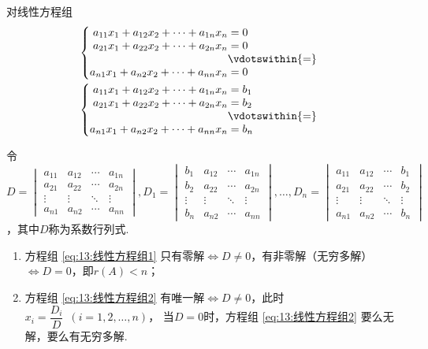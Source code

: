 \begin{theorem}  \label{thm:13:Cramer}
    对线性方程组
    \begin{gather}
        \label{eq:13:线性方程组1}
        \begin{cases} \begin{aligned}
            a_{11}x_1+a_{12}x_2+\cdots+a_{1n}x_n &= 0 \\
            a_{21}x_1+a_{22}x_2+\cdots+a_{2n}x_n &= 0 \\
            &\vdotswithin{ = } \\
            a_{n1}x_1+a_{n2}x_2+\cdots+a_{nn}x_n &= 0
        \end{aligned} \end{cases}
        \\
        \label{eq:13:线性方程组2}
        \begin{cases} \begin{aligned}
            a_{11}x_1+a_{12}x_2+\cdots+a_{1n}x_n &= b_1 \\
            a_{21}x_1+a_{22}x_2+\cdots+a_{2n}x_n &= b_2 \\
            &\vdotswithin{ = } \\
            a_{n1}x_1+a_{n2}x_2+\cdots+a_{nn}x_n &= b_n
        \end{aligned} \end{cases}
    \end{gather}

    令$D=\begin{vmatrix}
        a_{11} & a_{12} & \cdots & a_{1n} \\
        a_{21} & a_{22} & \cdots & a_{2n} \\
        \vdots & \vdots & \ddots & \vdots \\
        a_{n1} & a_{n2} & \cdots & a_{nn}
    \end{vmatrix},D_1=\begin{vmatrix}
        b_1 & a_{12} & \cdots & a_{1n} \\
        b_2 & a_{22} & \cdots & a_{2n} \\
        \vdots & \vdots & \ddots & \vdots \\
        b_n & a_{n2} & \cdots & a_{nn}
    \end{vmatrix},\ldots,D_n=\begin{vmatrix}
        a_{11} & a_{12} & \cdots & b_1 \\
        a_{21} & a_{22} & \cdots & b_2 \\
        \vdots & \vdots & \ddots & \vdots \\
        a_{n1} & a_{n2} & \cdots & b_n
    \end{vmatrix}$，其中$D$称为系数行列式.
    \begin{enumerate}
        \item 方程组 \ref{eq:13:线性方程组1} 只有零解$\iff D \neq 0$，有非零解（无穷多解）$\iff D=0$，即$r(A)<n$；

        \item 方程组 \ref{eq:13:线性方程组2} 有唯一解$\iff D \neq 0$，此时$x_i=\dfrac{D_i}{D}\enspace(i=1,2,\ldots,n)$，
        当$D=0$时，方程组 \ref{eq:13:线性方程组2} 要么无解，要么有无穷多解.
    \end{enumerate}
\end{theorem}
